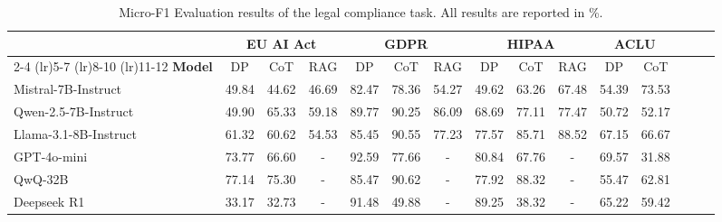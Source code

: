 \begin{table*}[htbp]
    \centering
    \small
    \setlength{\tabcolsep}{3pt}
    \begin{tabular}{lccc|ccc|ccc|ccc|cc}
        \toprule
        \multirow{2}{*}{}  & \multicolumn{3}{c|}{\textbf{EU AI Act}} & \multicolumn{3}{c|}{\textbf{GDPR}} & \multicolumn{3}{c|}{\textbf{HIPAA}} & \multicolumn{2}{c}{\textbf{ACLU}} \\ 
        \cmidrule(lr){2-4} \cmidrule(lr){5-7} \cmidrule(lr){8-10} \cmidrule(lr){11-12}
        \textbf{Model} & DP & CoT & RAG & DP & CoT & RAG & DP & CoT & RAG & DP & CoT \\ 
        \midrule
        Mistral-7B-Instruct & 49.84 & 44.62 & 46.69 & 82.47 & 78.36 & 54.27 & 49.62 & 63.26 & 67.48 & 54.39 & 73.53 \\
        Qwen-2.5-7B-Instruct & 49.90 & 65.33 & 59.18 & 89.77 & 90.25 & 86.09 & 68.69 & 77.11 & 77.47 & 50.72 & 52.17 \\
        Llama-3.1-8B-Instruct & 61.32 & 60.62 & 54.53 & 85.45 & 90.55 & 77.23 & 77.57 & 85.71 & 88.52 & 67.15 & 66.67 \\
        GPT-4o-mini & 73.77 & 66.60 & - & 92.59 & 77.66 & - & 80.84 & 67.76 & - & 69.57 & 31.88 \\
        QwQ-32B & 77.14 & 75.30 & - & 85.47 & 90.62 & - & 77.92 & 88.32 & - & 55.47 & 62.81 \\
        Deepseek R1 & 33.17 & 32.73 & - & 91.48 & 49.88 & - & 89.25 & 38.32 & - & 65.22 & 59.42 \\
        \bottomrule
    \end{tabular}
    \vspace{-0.1in}
    \caption{Micro-F1 Evaluation results of the legal compliance task. All results are reported in \%.}%
\label{tab:compliance_f1}
\vspace{-0.1in}
\end{table*}